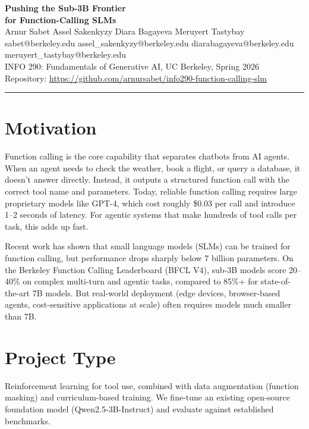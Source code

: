 \documentclass[11pt, letterpaper]{article}
\begin{document}
\begin{center}
  {\LARGE\bfseries Pushing the Sub-3B Frontier\\[4pt] for Function-Calling SLMs}\\[18pt]
  {\large Arnur Sabet \quad Assel Sakenkyzy \quad Diara Bagayeva \quad Meruyert Tastybay}\\[4pt]
  {\small\color{dimgray} sabet@berkeley.edu \quad assel\_sakenkyzy@berkeley.edu \quad diarabagayeva@berkeley.edu \quad meruyert\_tastybay@berkeley.edu}\\[6pt]
  {\color{dimgray} INFO 290: Fundamentals of Generative AI, UC Berkeley, Spring 2026}\\[6pt]
  {\color{dimgray}\small Repository: \url{https://github.com/arnursabet/info290-function-calling-slm}}
\end{center}

\vspace{6pt}
\hrule
\vspace{10pt}

\section*{Motivation}

Function calling is the core capability that separates chatbots from AI agents. When an agent needs to check the weather, book a flight, or query a database, it doesn't answer directly. Instead, it outputs a structured function call with the correct tool name and parameters. Today, reliable function calling requires large proprietary models like GPT-4, which cost roughly \$0.03 per call and introduce 1--2 seconds of latency. For agentic systems that make hundreds of tool calls per task, this adds up fast.

Recent work has shown that small language models (SLMs) can be trained for function calling, but performance drops sharply below 7 billion parameters. On the Berkeley Function Calling Leaderboard (BFCL V4), sub-3B models score 20--40\% on complex multi-turn and agentic tasks, compared to 85\%+ for state-of-the-art 7B models. But real-world deployment (edge devices, browser-based agents, cost-sensitive applications at scale) often requires models much smaller than 7B.

\section*{Project Type}

Reinforcement learning for tool use, combined with data augmentation (function masking) and curriculum-based training. We fine-tune an existing open-source foundation model (Qwen2.5-3B-Instruct) and evaluate against established benchmarks.
\end{document}
